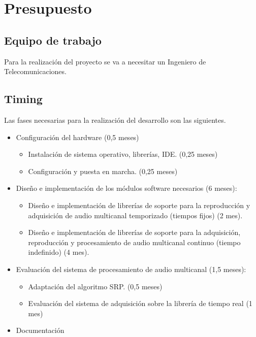 
\chapter{Presupuesto}
\label{cha:presupuesto}

\section{Equipo de trabajo}

Para la realización del proyecto se va a necesitar un Ingeniero de Telecomunicaciones.

\section{Timing}

Las fases necesarias para la realización del desarrollo son las siguientes.

\begin{itemize}
  \item Configuración del hardware (0,5 meses)
  
  \begin{itemize}
    \item Instalación de sistema operativo, librerías, IDE. (0,25 meses)
    \item Configuración y puesta en marcha. (0,25 meses)
  \end{itemize}
  
\item Diseño e implementación de los módulos software necesarios (6 meses):
  
  \begin{itemize}
    
  \item Diseño e implementación de librerías de soporte para la
    reproducción y adquisición de audio multicanal temporizado (tiempos
    fijos) (2 mes).
    
  \item Diseño e implementación de librerías de soporte para la
    adquisición, reproducción y procesamiento de audio multicanal
    continuo (tiempo indefinido) (4 mes).
    
  \end{itemize}
  

\item Evaluación del sistema de procesamiento de audio multicanal (1,5 meses):
  
  \begin{itemize}
    
  \item Adaptación del algoritmo SRP. (0,5 meses)
  
  \item Evaluación del sistema de adquisición sobre la librería de tiempo real (1 mes)
    
    \end{itemize}
  
\item Documentación

\end{itemize}

